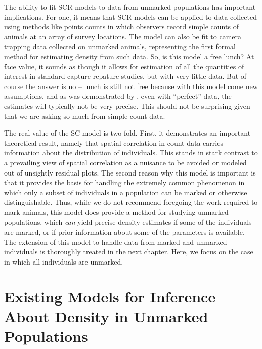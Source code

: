 The ability to fit SCR models to data from unmarked populations has
important implications. For one, it means that SCR models can
be applied to data collected using methods like points counts in which
observers record simple counts of animals at an array of survey
locations. The model can also be fit to camera trapping data collected on
unmarked animals, representing the first formal method for estimating
density from such data.
So, is this model a free lunch? At face value, it sounds as though it
allows for estimation of
all the quantities of interest in standard
capture-repature studies, but with very little
data. But of course the answer is no --
lunch is still not free because
with this model come new assumptions,
and as was demonstrated by
\citet{chandler_royle:2012}, even with ``perfect'' data, the estimates
will typically not be very precise. %
This should
not be surprising given that we are asking so much from simple count
data.

The real value of the SC model is two-fold. First, it demonstrates
an important theoretical result, namely
that spatial correlation in
count data carries information about the distribution of
individuals. This stands in stark contrast to a prevailing view of
spatial correlation as a nuisance to be avoided or modeled out of unsightly
residual plots. The second reason why this model is important is that
it provides the basis for handling the extremely common phenomenon in
which only a subset of individuals in a population can be marked or otherwise
distinguishable. Thus, while we do not recommend foregoing the work
required to mark animals, this model does provide a method for
studying unmarked populations, which \textit{can} yield precise
density estimates if some of the individuals are marked, or if prior
information about some of the parameters is available.
The extension of this model to handle data from marked and unmarked
individuals is thoroughly treated in the next chapter. Here, we focus
on the case in which all individuals are unmarked.

\section{Existing Models for Inference About Density in Unmarked Populations}
\label{Sect.existing-unmarked}

